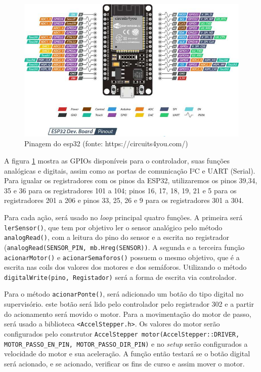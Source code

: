 \begin{figure}[h]
	\centering
	\label{fig:esp_32_pinout}
		\includegraphics[keepaspectratio=true,scale=0.6]{figuras/ESP32-Pinout.jpg}
	\caption{Pinagem do esp32 (fonte: https://circuits4you.com/)}
\end{figure}

A figura \ref{fig:esp_32_pinout} mostra as GPIOs disponíveis para o controlador, suas funções analógicas e digitais, assim como as portas de comunicação I²C e UART (Serial). Para igualar os registradores com os pinos da ESP32, utilizaremos os pinos 39,34, 35 e 36 para os registradores 101 a 104; pinos 16, 17, 18, 19, 21 e 5 para os registradores 201 a 206 e pinos 33, 25, 26 e 9 para os registradores 301 a 304.

Para cada ação, será usado no \textit{loop} principal quatro funções. A primeira será \texttt{lerSensor()}, que tem por objetivo ler o sensor analógico pelo método \texttt{analogRead()}, com a leitura do pino do sensor e a escrita no registrador (\texttt{analogRead(SENSOR\_PIN, mb.Hreg(SENSOR))}. A segunda e a terceira função \texttt{acionarMotor()} e \texttt{acionarSemaforos()} possuem o mesmo objetivo, que é a escrita nas coils dos valores dos motores e dos semáforos. Utilizando o método \texttt{digitalWrite(pino, Registador)} será a forma de escrita via controlador.

Para o método \texttt{acionarPonte()}, será adicionado um botão do tipo digital no supervisório. este botão será lido pelo controlador pelo registrador 302 e a partir do acionamento será movido o motor. Para a movimentação do motor de passo, será usado a biblioteca \texttt{<AccelStepper.h>}. Os valores do motor serão configurados pelo construtor \texttt{AccelStepper motor(AccelStepper::DRIVER, MOTOR\_PASSO\_EN\_PIN, MOTOR\_PASSO\_DIR\_PIN)} e no \textit{setup} serão configurados a velocidade do motor e sua aceleração. A função então testará se o botão digital será acionado, e se acionado, verificar os fins de curso e assim mover o motor. 

